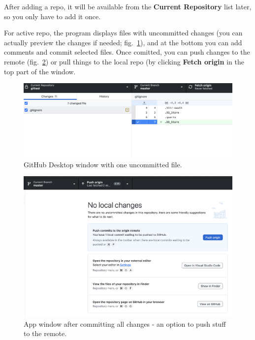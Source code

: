 \documentclass{tufte-handout}
\begin{document}
After adding a repo, it will be available from the \textbf{Current Repository} list later, so you only have to add it once.

For active repo, the program displays files with uncommitted changes (you can actually preview the changes if needed; fig.~\ref{fig:ghd-window}), and at the bottom you can add comments and commit selected files. Once comitted, you can push changes to the remote (fig.~\ref{fig:ghd-push}) or pull things to the local repo (by clicking \textbf{Fetch origin} in the top part of the window.

\begin{figure}
    \includegraphics[width=1\linewidth]{Zrzut ekranu 2024-12-20 o 14.27.24.png}
    \caption{GitHub Desktop window with one uncommitted file.}
    \label{fig:ghd-window}
\end{figure}

\begin{figure}
    \centering
    \includegraphics[width=1\linewidth]{Zrzut ekranu 2024-12-20 o 14.30.47.png}
    \caption{App window after committing all changes - an option to push stuff to the remote.}
    \label{fig:ghd-push}
\end{figure}
\end{document}

